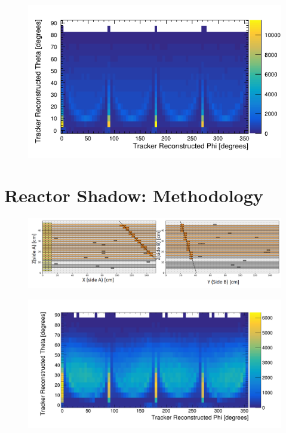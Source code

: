 \begin{figure}[H]
 \centering
 \includegraphics[width=0.8\linewidth]{Chapter5/Figs/Raster/simulatedNormalDistirbution.png}
 \label{fig:simulatedNormalDist}
\end{figure}

\section{Reactor Shadow: Methodology} \label{sec:ReactorShadowMethodology}

\begin{figure}[H]
 \centering
 \includegraphics[width=\linewidth]{Chapter5/Figs/Raster/3000ExampleEvent.png}
 \label{fig:3000ExampleEvent}
\end{figure}

\begin{figure}[H]
 \centering
 \includegraphics[width=0.8\linewidth]{Chapter5/Figs/Raster/simpleTrackTheta3000-9999IncBelow10.png}
 \label{fig:reactorShadowSimpleTracker}
\end{figure}

